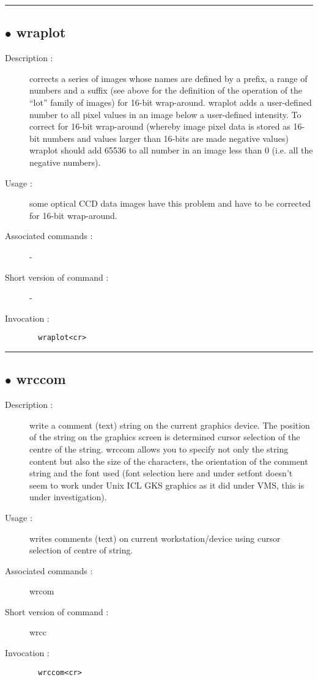 \hrule \subsection*{$\bullet$ wraplot}
\begin{description}
\item[Description :] corrects a series of images whose names are defined by a
prefix, a range of numbers and a suffix (see above for the definition of
the operation of the ``lot'' family of images) for 16-bit wrap-around.
wraplot adds a user-defined number to all pixel values in an image below
a user-defined intensity.  To correct for 16-bit wrap-around (whereby
image pixel data is stored as 16-bit numbers and values larger than
16-bits are made negative values) wraplot should add 65536 to all number
in an image less than 0 (i.e. all the negative numbers).
\item[Usage :] some optical CCD data images have this problem and have to be
corrected for 16-bit wrap-around.
\item[Associated commands :] -
\item[Short version of command :] -
\item[Invocation :]

\verb+  wraplot<cr> +\end{description}

\hrule \subsection*{$\bullet$ wrccom}
\begin{description}
\item[Description :] write a comment (text) string on the current graphics device.
The position of the string on the graphics screen is determined cursor
selection of the centre of the string.  wrccom allows you to specify not
only the string content but also the size of the characters, the
orientation of the comment string and the font used (font selection here
and under setfont doesn't seem to work under Unix ICL GKS graphics as it
did under VMS, this is under investigation).
\item[Usage :] writes comments (text) on current workstation/device using cursor
selection of centre of string.
\item[Associated commands :] wrcom
\item[Short version of command :] wrcc
\item[Invocation :]

\verb+  wrccom<cr> +\end{description}

